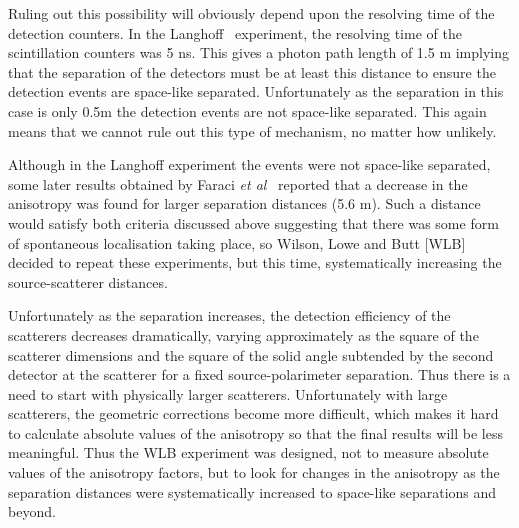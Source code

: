 \documentclass[12pt]{article}
\begin{document}
Ruling out this possibility will obviously depend upon the resolving time of the detection counters. In the Langhoff~\cite{hl60} experiment, the resolving time of the scintillation counters was 5 ns. This gives a photon path length of 1.5 m implying that the separation of the detectors must be at least this distance to ensure the detection events are space-like separated.  Unfortunately as the separation in this case is only 0.5m the detection events are not space-like separated.  This again means that we cannot rule out this type of mechanism, no matter how unlikely.

Although in the  Langhoff experiment the  events were not space-like separated, some later results  obtained by Faraci {\em et al}~\cite{dfdg74} 
 reported that a  decrease in the anisotropy was found for  larger separation distances (5.6 m). Such a distance would satisfy both criteria discussed above    suggesting that there was some form of spontaneous localisation taking place, so Wilson, Lowe and Butt [WLB]~\cite{awjldb67}
 decided to repeat these experiments, but this time, systematically increasing the source-scatterer distances.  
 
Unfortunately as the separation increases, the detection efficiency of the scatterers decreases dramatically, varying approximately as the square of the scatterer dimensions and the square of the solid angle subtended by the second detector at the scatterer for a fixed source-polarimeter separation.  Thus there is a need to start with physically larger scatterers.
 Unfortunately with large scatterers, the geometric corrections become more difficult, which makes it hard to calculate absolute values of the anisotropy so that the final results will be less meaningful. Thus the WLB experiment was designed, not to measure absolute values of the anisotropy factors, but to look for changes in the anisotropy as the separation distances were systematically increased to space-like separations and  beyond.
 
\end{document}
